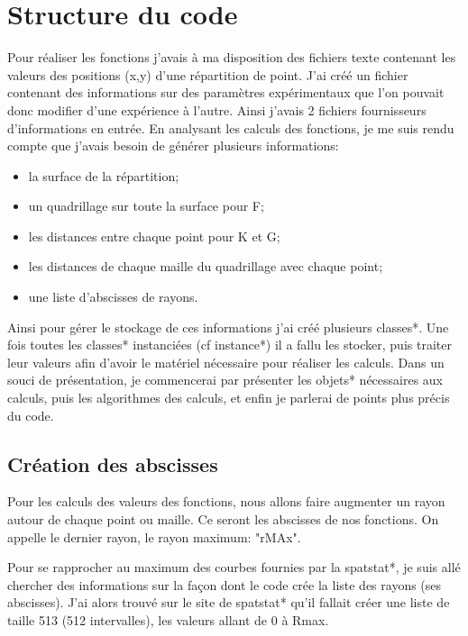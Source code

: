 \documentclass[stage2a]{tnreport}
\begin{document}
\section{Structure du code}

Pour réaliser les fonctions j'avais à ma disposition des fichiers texte contenant les valeurs des positions (x,y) d'une répartition de point. J'ai créé un fichier contenant des informations sur des paramètres expérimentaux que l'on pouvait donc modifier d'une expérience à l'autre. Ainsi j'avais 2 fichiers fournisseurs d'informations en entrée.
En analysant les calculs des fonctions, je me suis rendu compte que j'avais besoin de générer plusieurs informations:
\begin{itemize}
\item la surface de la répartition;
\item un quadrillage sur toute la surface pour F;
\item les distances entre chaque point pour K et G;
\item les distances de chaque maille du quadrillage avec chaque point;
\item une liste d'abscisses de rayons.\\
\end{itemize}
Ainsi pour gérer le stockage de ces informations j'ai créé plusieurs \gls{classe}s*. Une fois toutes les \gls{classe}s* instanciées (cf \gls{instance}*) il a fallu les stocker, puis traiter leur valeurs afin d'avoir le matériel nécessaire pour réaliser les calculs. Dans un souci de présentation, je commencerai par présenter les \gls{objet}s* nécessaires aux calculs, puis les algorithmes des calculs, et enfin je parlerai de points plus précis du code. 

\subsection{Création des abscisses}

Pour les calculs des valeurs des fonctions, nous allons faire augmenter un rayon autour de chaque point ou maille. Ce seront les abscisses de nos fonctions. On appelle le dernier rayon, le rayon maximum: "rMAx".

Pour se rapprocher au maximum des courbes fournies par la \gls{spatstat}*, je suis allé chercher des informations sur la façon dont le code crée la liste des rayons (ses abscisses). J'ai alors trouvé sur le site de \gls{spatstat}*\cite{FAQspatstat} qu'il fallait créer une liste de taille 513 (512 intervalles), les valeurs allant de 0 à Rmax.
\end{document}
